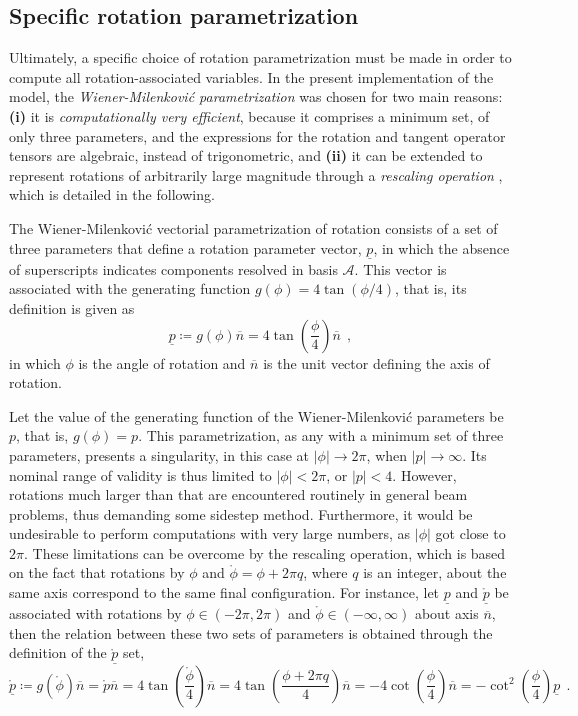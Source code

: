 \documentclass[12pt,a4paper,oneside,english]{abntex2} %
\newcommand{\vect}[1]{\underline{#1}}
\newcommand{\uvec}[1]{\overline{#1}}
\def\lp{\left(}
\def\rp{\right)}
\def\A{\mathcal{A}}
\def\p{\vect{p}}
\def\phiscl{\mathring{\phi}}
\def\pscaled{\mathring{\p}}
\def\pscalednorm{\mathring{p}}
\begin{document}
\begin{apendicesenv}
\section{Specific rotation parametrization}
\label{sec:rotpar}

Ultimately, a specific choice of rotation parametrization must be made in order to compute all rotation-associated variables. In the present implementation of the model, the \textit{Wiener-Milenkovi\'{c} parametrization} \cite{bauchau2011flexible} was chosen for two main reasons: \textbf{(i)} it is \textit{computationally very efficient}, because it comprises a minimum set, of only three parameters, and the expressions for the rotation and tangent operator tensors are algebraic, instead of trigonometric, and \textbf{(ii)} it can be extended to represent rotations of arbitrarily large magnitude through a \textit{rescaling operation} \cite{bauchau2011flexible}, which is detailed in the following.

The Wiener-Milenkovi\'{c} vectorial parametrization of rotation consists of a set of three parameters that define a rotation parameter vector, $\p$, in which the absence of superscripts indicates components resolved in basis $\A$. This vector is associated with the generating function $g(\phi) = 4\tan(\phi/4)$, that is, its definition is given as
\begin{equation}
    \p \coloneqq g(\phi)\uvec{n} = 4\tan\lp\frac{\phi}{4}\rp\uvec{n} \ \ ,
    \label{eq:WM_def}
\end{equation}
in which $\phi$ is the angle of rotation and $\uvec{n}$ is the unit vector defining the axis of rotation. 

Let the value of the generating function of the Wiener-Milenkovi\'{c} parameters be $p$, that is, $g(\phi)=p$. This parametrization, as any with a minimum set of three parameters, presents a singularity, in this case at $|\phi| \rightarrow 2\pi$, when $|p| \rightarrow \infty$. Its nominal range of validity is thus limited to $|\phi| < 2\pi$, or $|p| < 4$. However, rotations much larger than that are encountered routinely in general beam problems, thus demanding some sidestep method. Furthermore, it would be undesirable to perform computations with very large numbers, as $|\phi|$ got close to $2\pi$. These limitations can be overcome by the rescaling operation, which is based on the fact that rotations by $\phi$ and $\phiscl = \phi + 2\pi q$, where $q$ is an integer, about the same axis correspond to the same final configuration. For instance, let $\p$ and $\pscaled$ be associated with rotations by $\phi\in(-2\pi,2\pi)$ and $\phiscl\in(-\infty,\infty)$ about axis $\uvec{n}$, then the relation between these two sets of parameters is obtained through the definition of the $\pscaled$ set, 
\begin{equation}
    \pscaled \coloneqq g(\phiscl)\uvec{n} = \pscalednorm\uvec{n} = 4\tan\lp\frac{\phiscl}{4}\rp\uvec{n} = 4\tan\lp\frac{\phi+2\pi q}{4}\rp\uvec{n} = -4\cot\lp\frac{\phi}{4}\rp\uvec{n} = -\cot^2\lp\frac{\phi}{4}\rp\p  \ \ .
    \label{eq:pdag}
\end{equation}


\end{apendicesenv}
\end{document}
